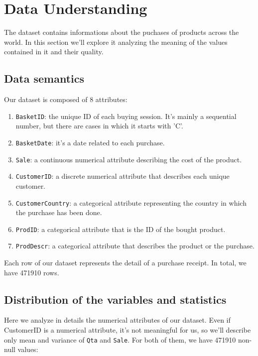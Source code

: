 \documentclass[12pt]{article}
\begin{document}
\tableofcontents
\thispagestyle{empty}
\pagebreak

\setcounter{page}{1}
\section{Data Understanding}
The dataset contains informations about the puchases of products across the world. In this section we'll explore it analyzing the meaning of the values contained in it and their quality.

\subsection{Data semantics}

Our dataset is composed of 8 attributes:
\begin{enumerate}
    \item \texttt{BasketID}: the unique ID of each buying session. It's mainly a sequential number, but there are cases in which it starts with 'C'.
    \item  \texttt{BasketDate}: it's a date related to each purchase.
    \item  \texttt{Sale}: a continuous numerical attribute describing the cost of the product.
    \item  \texttt{CustomerID}: a discrete numerical attribute that describes each unique customer.
    \item  \texttt{CustomerCountry}: a categorical attribute representing the country in which the purchase has been done.
    \item  \texttt{ProdID}: a categorical attribute that is the ID of the bought product.
    \item  \texttt{ProdDescr}: a categorical attribute that describes the product or the purchase.
\end{enumerate}

Each row of our dataset represents the detail of a purchase receipt. In total, we have 471910 rows.

\subsection{Distribution of the variables and statistics}
Here we analyze in details the numerical attributes of our dataset. Even if CustomerID is a numerical attribute, it's not meaningful for us, so we'll describe only mean and variance of \texttt{Qta} and \texttt{Sale}. For both of them, we have 471910 non-null values:
\end{document}
